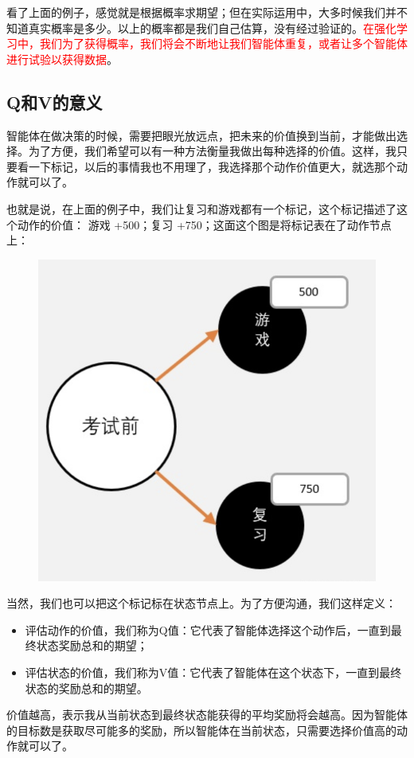\documentclass[12pt]{article}
\begin{document}
看了上面的例子，感觉就是根据概率求期望；但在实际运用中，大多时候我们并不知道真实概率是多少。以上的概率都是我们自己估算，没有经过验证的。\textcolor{red}{在强化学习中，我们为了获得概率，我们将会不断地让我们智能体重复，或者让多个智能体进行试验以获得数据}。

\subsection{Q和V的意义}
智能体在做决策的时候，需要把眼光放远点，把未来的价值换到当前，才能做出选择。为了方便，我们希望可以有一种方法衡量我做出每种选择的价值。这样，我只要看一下标记，以后的事情我也不用理了，我选择那个动作价值更大，就选那个动作就可以了。

也就是说，在上面的例子中，我们让复习和游戏都有一个标记，这个标记描述了这个动作的价值： 游戏 +500；复习 +750；这面这个图是将标记表在了动作节点上：
\begin{figure}[H]
    \centering
    \includegraphics[width=.3\textwidth]{fig/ReinforcementLearning/RL_V_Q_R_Example_3.png}
\end{figure}

当然，我们也可以把这个标记标在状态节点上。为了方便沟通，我们这样定义： 
\begin{itemize}
\setlength{\itemsep}{0pt}
\setlength{\parsep}{0pt}
\setlength{\parskip}{0pt}
    \item 评估动作的价值，我们称为Q值：它代表了智能体选择这个动作后，一直到最终状态奖励总和的期望；
    \item 评估状态的价值，我们称为V值：它代表了智能体在这个状态下，一直到最终状态的奖励总和的期望。
\end{itemize}

价值越高，表示我从当前状态到最终状态能获得的平均奖励将会越高。因为智能体的目标数是获取尽可能多的奖励，所以智能体在当前状态，只需要选择价值高的动作就可以了。
\end{document}
